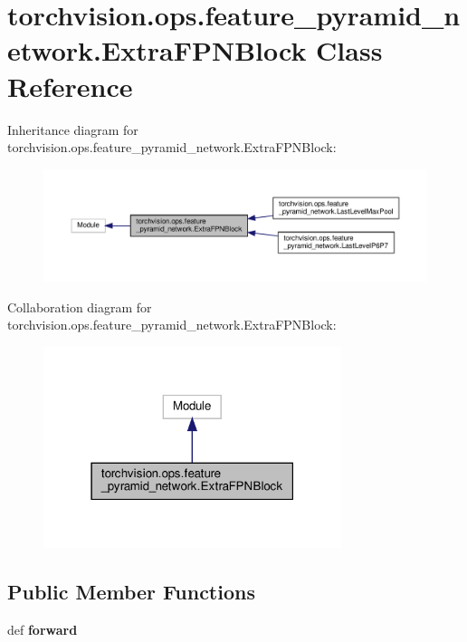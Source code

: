 \hypertarget{classtorchvision_1_1ops_1_1feature__pyramid__network_1_1ExtraFPNBlock}{}\section{torchvision.\+ops.\+feature\+\_\+pyramid\+\_\+network.\+Extra\+F\+P\+N\+Block Class Reference}
\label{classtorchvision_1_1ops_1_1feature__pyramid__network_1_1ExtraFPNBlock}


Inheritance diagram for torchvision.\+ops.\+feature\+\_\+pyramid\+\_\+network.\+Extra\+F\+P\+N\+Block\+:
\nopagebreak
\begin{figure}[H]
\begin{center}
\leavevmode
\includegraphics[width=350pt]{classtorchvision_1_1ops_1_1feature__pyramid__network_1_1ExtraFPNBlock__inherit__graph}
\end{center}
\end{figure}


Collaboration diagram for torchvision.\+ops.\+feature\+\_\+pyramid\+\_\+network.\+Extra\+F\+P\+N\+Block\+:
\nopagebreak
\begin{figure}[H]
\begin{center}
\leavevmode
\includegraphics[width=247pt]{classtorchvision_1_1ops_1_1feature__pyramid__network_1_1ExtraFPNBlock__coll__graph}
\end{center}
\end{figure}
\subsection*{Public Member Functions}
\begin{DoxyCompactItemize}
\item 
\mbox{\label{classtorchvision_1_1ops_1_1feature__pyramid__network_1_1ExtraFPNBlock_ad6d7240694d2d108102a582c7da81820}} 
def {\bfseries forward}
\end{DoxyCompactItemize}


